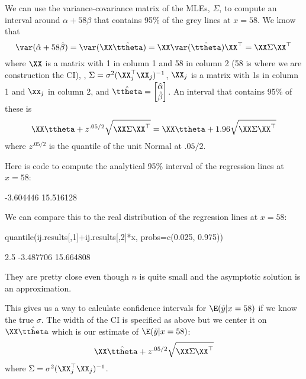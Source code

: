 We can use the variance-covariance matrix of the MLEs, $\Sigma$, to compute an interval around $\alpha+58 \beta$ that contains 95\% of the grey lines at $x=58$.  We know that
\begin{equation}
\var(\hat{\alpha} + 58 \hat{\beta}) = \var(\XX \hat{\ttheta}) =  \XX \var(\hat{\ttheta}) \XX^\top = \XX  \Sigma \XX^\top
\end{equation}
where $\XX$ is a matrix with 1 in column 1 and 58 in column 2 (58 is where we are construction the CI), , $\Sigma=\sigma^2 (\XX_j^\top\XX_j)^{-1}$, $\XX_j$ is a matrix with 1s in column 1 and $\xx_j$ in column 2,  and $\hat{\ttheta}=\begin{bmatrix}\hat{\alpha}\\ \hat{\beta}\end{bmatrix}$.
An interval that contains 95\% of these is
$$ \XX \ttheta + z^{.05/2} \sqrt{\XX\Sigma\XX^\top}= \XX \ttheta + 1.96 \sqrt{\XX\Sigma\XX^\top}$$
where $z^{.05/2}$ is the quantile of the unit Normal at $.05/2$.

Here is code to compute the analytical 95\% interval of the regression lines at $x=58$:
\begin{Schunk}
\begin{Soutput}
[1] -3.604446 15.516128
\end{Soutput}
\end{Schunk}
We can compare this to the real distribution of the regression lines at $x=58$:
\begin{Schunk}
\begin{Sinput}
 quantile(ij.results[,1]+ij.results[,2]*x, probs=c(0.025, 0.975))
\end{Sinput}
\begin{Soutput}
     2.5%     97.5% 
-3.487706 15.664808 
\end{Soutput}
\end{Schunk}
They are pretty close even though $n$ is quite small and the asymptotic solution is an approximation.

This gives us a way to calculate confidence intervals for $\E(|x=58)$ if we know the true $\sigma$. The width of the CI is specified as above but we center it on $\XX \hat{\ttheta}$ which is our estimate of $\E(|x=58)$:
$$\XX \hat{\ttheta}  + z^{.05/2} \sqrt{\XX\Sigma\XX^\top}$$
where $\Sigma=\sigma^2(\XX_j^\top\XX_j)^{-1}$.


